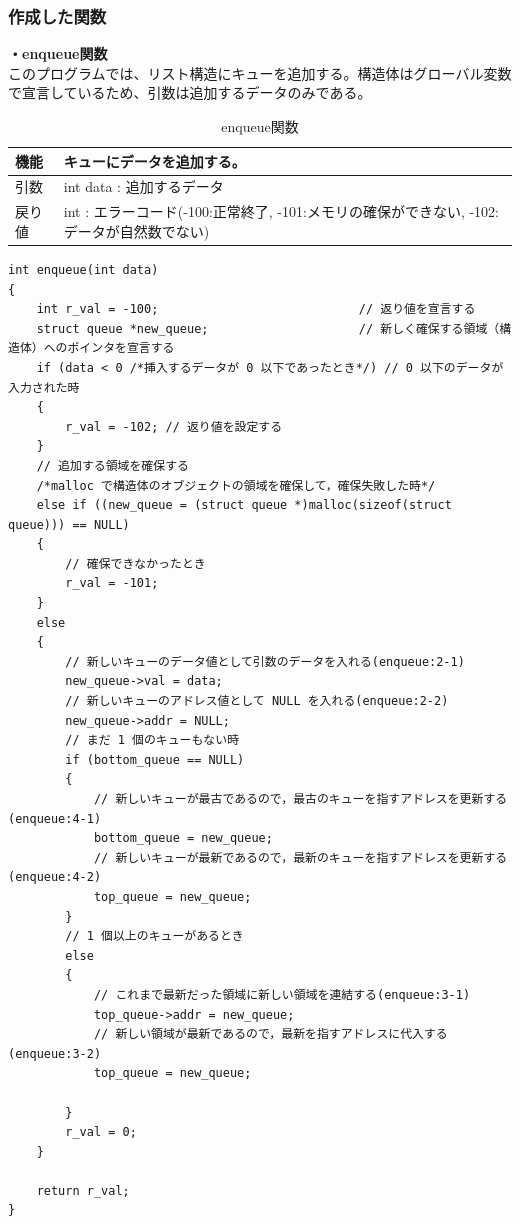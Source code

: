 \documentclass[dvipdfmx]{jsarticle}
\begin{document}
\subsubsection{作成した関数}
\textbf{・enqueue関数}\\
このプログラムでは、リスト構造にキューを追加する。構造体はグローバル変数で宣言しているため、引数は追加するデータのみである。
\begin{table}[ht]
  \centering
  \caption{enqueue関数}
  \begin{tabular}{|p{5cm}|p{10cm}|}
    \hline
    機能  & キューにデータを追加する。                                      \\
    \hline
    引数  & int data : 追加するデータ \\
    \hline
    戻り値 & int : エラーコード(-100:正常終了, -101:メモリの確保ができない, -102:データが自然数でない) \\
    \hline
  \end{tabular}
  \label{tab:enqueue_func_3}
\end{table}
\begin{lstlisting}[caption={enqueue関数}, label={lst:enqueue_func_3}]
int enqueue(int data)
{
    int r_val = -100;                            // 返り値を宣言する
    struct queue *new_queue;                     // 新しく確保する領域（構造体）へのポインタを宣言する
    if (data < 0 /*挿入するデータが 0 以下であったとき*/) // 0 以下のデータが入力された時
    {
        r_val = -102; // 返り値を設定する
    }
    // 追加する領域を確保する
    /*malloc で構造体のオブジェクトの領域を確保して，確保失敗した時*/
    else if ((new_queue = (struct queue *)malloc(sizeof(struct queue))) == NULL)
    {
        // 確保できなかったとき
        r_val = -101;
    }
    else
    {
        // 新しいキューのデータ値として引数のデータを入れる(enqueue:2-1)
        new_queue->val = data;
        // 新しいキューのアドレス値として NULL を入れる(enqueue:2-2)
        new_queue->addr = NULL;
        // まだ 1 個のキューもない時
        if (bottom_queue == NULL)
        {
            // 新しいキューが最古であるので，最古のキューを指すアドレスを更新する(enqueue:4-1)
            bottom_queue = new_queue;
            // 新しいキューが最新であるので，最新のキューを指すアドレスを更新する(enqueue:4-2)
            top_queue = new_queue;
        }
        // 1 個以上のキューがあるとき
        else
        {
            // これまで最新だった領域に新しい領域を連結する(enqueue:3-1)
            top_queue->addr = new_queue;
            // 新しい領域が最新であるので，最新を指すアドレスに代入する(enqueue:3-2)
            top_queue = new_queue;

        }
        r_val = 0;
    }

    return r_val;
}
\end{lstlisting}
\end{document}
